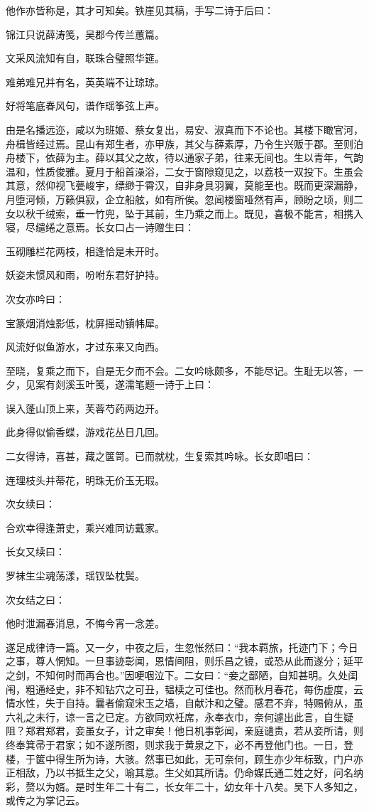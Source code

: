 \documentclass[a4paper,12pt,UTF8,twoside]{ctexbook}
\begin{document}
他作亦皆称是，其才可知矣。铁崖见其稿，手写二诗于后曰：

锦江只说薛涛笺，吴郡今传兰蕙篇。

文采风流知有自，联珠合璧照华筵。

难弟难兄并有名，英英端不让琼琼。

好将笔底春风句，谱作瑶筝弦上声。

由是名播远迩，咸以为班姬、蔡女复出，易安、淑真而下不论也。其楼下瞰官河，舟楫皆经过焉。昆山有郑生者，亦甲族，其父与薛素厚，乃令生兴贩于郡。至则泊舟楼下，依薛为主。薛以其父之故，待以通家子弟，往来无间也。生以青年，气韵温和，性质俊雅。夏月于船首澡浴，二女于窗隙窥见之，以荔枝一双投下。生虽会其意，然仰视飞甍峻宇，缥缈于霄汉，自非身具羽翼，莫能至也。既而更深漏静，月堕河倾，万籁俱寂，企立船舷，如有所俟。忽闻楼窗哑然有声，顾盼之顷，则二女以秋千绒索，垂一竹兜，坠于其前，生乃乘之而上。既见，喜极不能言，相携入寝，尽缱绻之意焉。长女口占一诗赠生曰：

玉砌雕栏花两枝，相逢恰是未开时。

妖姿未惯风和雨，吩咐东君好护持。

次女亦吟曰：

宝篆烟消烛影低，枕屏摇动镇帏犀。

风流好似鱼游水，才过东来又向西。

至晓，复乘之而下，自是无夕而不会。二女吟咏颇多，不能尽记。生耻无以答，一夕，见案有剡溪玉叶笺，遂濡笔题一诗于上曰：

误入蓬山顶上来，芙蓉芍药两边开。

此身得似偷香蝶，游戏花丛日几回。

二女得诗，喜甚，藏之箧笥。已而就枕，生复索其吟咏。长女即唱曰：

连理枝头并蒂花，明珠无价玉无瑕。

次女续曰：

合欢幸得逢萧史，乘兴难同访戴家。

长女又续曰：

罗袜生尘魂荡漾，瑶钗坠枕鬓。

次女结之曰：

他时泄漏春消息，不悔今宵一念差。

遂足成律诗一篇。又一夕，中夜之后，生忽怅然曰：“我本羁旅，托迹门下；今日之事，尊人惘知。一旦事迹彰闻，恩情间阻，则乐昌之镜，或恐从此而遂分；延平之剑，不知何时而再合也。”因哽咽泣下。二女曰：“妾之鄙陋，自知甚明。久处闺闱，粗通经史，非不知钻穴之可丑，韫椟之可佳也。然而秋月春花，每伤虚度，云情水性，失于自持。曩者偷窥宋玉之墙，自献汴和之璧。感君不弃，特赐俯从，虽六礼之未行，谅一言之已定。方欲同欢衽席，永奉衣巾，奈何遽出此言，自生疑阻？郑君郑君，妾虽女子，计之审矣！他日机事彰闻，亲庭谴责，若从妾所请，则终奉箕帚于君家；如不遂所图，则求我于黄泉之下，必不再登他门也。一日，登楼，于箧中得生所为诗，大骇。然事已如此，无可奈何，顾生亦少年标致，门户亦正相敌，乃以书抵生之父，喻其意。生父如其所请。仍命媒氏通二姓之好，问名纳彩，赘以为婿。是时生年二十有二，长女年二十，幼女年十八矣。吴下人多知之，或传之为掌记云。
\end{document}
